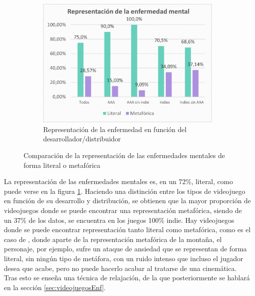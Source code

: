 \documentclass[12pt, a4paper,twoside,titlepage]{book}
\begin{document}
\begin{figure}
\begin{subfigure}{.6\textwidth}
  \includegraphics[width=.95\linewidth]{Graficas estudio/G10; RepmetlitVS.png}
  \caption{Representación de la enfermedad en función del desarrollador/distribuidor}
\end{subfigure}
\caption{Comparación de la representación de las enfermedades mentales de forma literal o metafórica}
\label{fig:ESTrepresentacion}
\end{figure}



La representación de las enfermedades mentales es, en un 72\%, literal, como puede verse en la figura \ref{fig:ESTrepresentacion}. Haciendo una distinción entre los tipos de videojuego en función de su desarrollo y distribución, se obtienen que la mayor proporción de videojuegos donde se puede encontrar una representación metafórica, siendo de un 37\% de los datos, se encuentra en los juegos 100\% indie. Hay videojuegos donde se puede encontrar representación tanto literal como metafórica, como es el caso de , donde aparte de la representación metafórica de la montaña, el personaje, por ejemplo, sufre un ataque de ansiedad que se representan de forma literal, sin ningún tipo de metáfora, con un ruido intenso que incluso el jugador desea que acabe, pero no puede hacerlo acabar al tratarse de una cinemática. Tras esto se enseña una técnica de relajación, de la que posteriormente se hablará en la sección \ref{sec:videojuegosEnf}.
\end{document}
